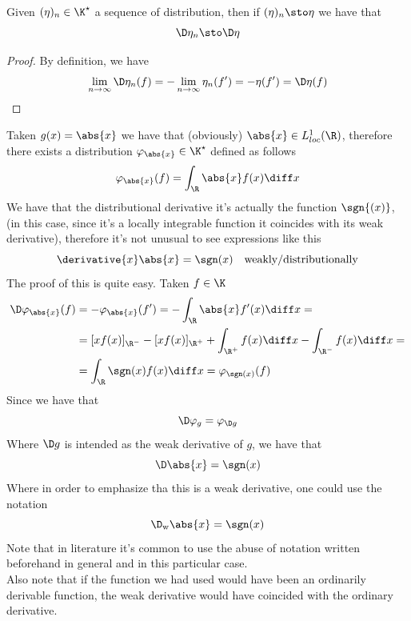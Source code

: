 \documentclass[../mmf.tex]{subfiles}
\begin{document}
\begin{thm}
	Given $(\eta)_n\in\K^\star$ a sequence of distribution, then if $(\eta)_n\sto\eta$ we have that
	\begin{equation*}
		\D\eta_n\sto\D\eta
	\end{equation*}
\end{thm}
\begin{proof}
	By definition, we have
	\begin{equation*}
		\lim_{n\to\infty}\D\eta_n(f)=-\lim_{n\to\infty}\eta_n(f')=-\eta(f')=\D\eta(f)
	\end{equation*}
\end{proof}
\begin{eg}
	Taken $g(x)=\abs{x}$ we have that (obviously) $\abs{x}\in L^1_{loc}(\R)$, therefore there exists a distribution $\varphi_{\abs{x}}\in\K^\star$ defined as follows
	\begin{equation*}
		\varphi_{\abs{x}}(f)=\int_{\R}^{}\abs{x}f(x)\diff x
	\end{equation*}
	We have that the distributional derivative it's actually the function $\sgn{(x)}$, (in this case, since it's a locally integrable function it coincides with its weak derivative), therefore it's not unusual to see expressions like this
	\begin{equation*}
		\derivative{x}\abs{x}=\sgn(x)\quad\text{weakly/distributionally}
	\end{equation*}
	The proof of this is quite easy. Taken $f\in\K$
	\begin{equation*}
		\begin{aligned}
			\D\varphi_{\abs{x}}(f)&=-\varphi_{\abs{x}}(f')=-\int_{\R}^{}\abs{x}f'(x)\diff x=\\
			&=[xf(x)]_{\R^-}-[xf(x)]_{\R^+}+\int_{\R^+}^{}f(x)\diff x-\int_{\R^-}^{}f(x)\diff x=\\
			&=\int_{\R}^{}\sgn(x)f(x)\diff x=\varphi_{\sgn(x)}(f)
		\end{aligned}
	\end{equation*}
	Since we have that
	\begin{equation*}
		\D\varphi_{g}=\varphi_{\D g}
	\end{equation*}
	Where $\D g$ is intended as the weak derivative of $g$, we have that
	\begin{equation*}
		\D\abs{x}=\sgn(x)
	\end{equation*}
	Where in order to emphasize tha this is a weak derivative, one could use the notation
	\begin{equation*}
		\D_{\mathrm{w}}\abs{x}=\sgn(x)
	\end{equation*}
	Note that in literature it's common to use the abuse of notation written beforehand in general and in this particular case.\\
	Also note that if the function we had used would have been an ordinarily derivable function, the weak derivative would have coincided with the ordinary derivative.
\end{eg}
\end{document}
